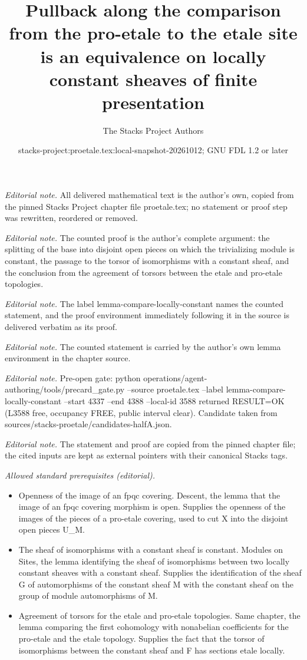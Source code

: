 \documentclass[10pt,a4paper]{amsart}
\title{Pullback along the comparison from the pro-etale to the etale site is an equivalence on locally constant sheaves of finite presentation}
\author{The Stacks Project Authors}
\date{stacks-project:proetale.tex:local-snapshot-20261012; GNU FDL 1.2 or later}
\theoremstyle{plain}
\theoremstyle{definition}
\theoremstyle{remark}
\numberwithin{equation}{subsection}
\begin{document}
\maketitle
\noindent\textit{Editorial note.} All delivered mathematical text is the author's own, copied from the pinned Stacks Project chapter file proetale.tex; no statement or proof step was rewritten, reordered or removed.\par\medskip
\noindent\textit{Editorial note.} The counted proof is the author's complete argument: the splitting of the base into disjoint open pieces on which the trivializing module is constant, the passage to the torsor of isomorphisms with a constant sheaf, and the conclusion from the agreement of torsors between the etale and pro-etale topologies.\par\medskip
\noindent\textit{Editorial note.} The label lemma-compare-locally-constant names the counted statement, and the proof environment immediately following it in the source is delivered verbatim as its proof.\par\medskip
\noindent\textit{Editorial note.} The counted statement is carried by the author's own lemma environment in the chapter source.\par\medskip
\noindent\textit{Editorial note.} Pre-open gate: python operations/agent-authoring/tools/precard\_gate.py --source proetale.tex --label lemma-compare-locally-constant --start 4337 --end 4388 --local-id 3588 returned RESULT=OK (L3588 free, occupancy FREE, public interval clear). Candidate taken from sources/stacks-proetale/candidates-halfA.json.\par\medskip
\noindent\textit{Editorial note.} The statement and proof are copied from the pinned chapter file; the cited inputs are kept as external pointers with their canonical Stacks tags.\par\medskip
\noindent\textit{Allowed standard prerequisites (editorial).}\begin{itemize}
\item Openness of the image of an fpqc covering. Descent, the lemma that the image of an fpqc covering morphism is open. Supplies the openness of the images of the pieces of a pro-etale covering, used to cut X into the disjoint open pieces U\_M.
\item The sheaf of isomorphisms with a constant sheaf is constant. Modules on Sites, the lemma identifying the sheaf of isomorphisms between two locally constant sheaves with a constant sheaf. Supplies the identification of the sheaf G of automorphisms of the constant sheaf M with the constant sheaf on the group of module automorphisms of M.
\item Agreement of torsors for the etale and pro-etale topologies. Same chapter, the lemma comparing the first cohomology with nonabelian coefficients for the pro-etale and the etale topology. Supplies the fact that the torsor of isomorphisms between the constant sheaf and F has sections etale locally.
\end{itemize}\medskip
\end{document}

